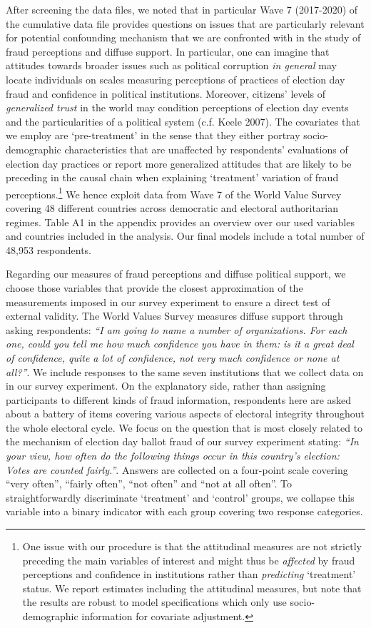 \documentclass[11pt, ngerman,english,a4]{article}
\begin{document}
After screening the data files, we noted that in particular Wave 7 (2017-2020) of the cumulative data file provides questions on issues that are particularly relevant for potential confounding mechanism that we are confronted with in the study of fraud perceptions and diffuse support. In particular, one can imagine that attitudes towards broader issues such as political corruption \textit{in general} may locate individuals on scales measuring perceptions of practices of election day fraud and confidence in political institutions. Moreover, citizens’ levels of \textit{generalized trust} in the world may condition perceptions of election day events and the particularities of a political system (c.f. Keele 2007). The covariates that we employ are `pre-treatment’ in the sense that they either portray socio-demographic characteristics that are unaffected by respondents’ evaluations of election day practices or report more generalized attitudes that are likely to be preceding in the causal chain when explaining `treatment’ variation of fraud perceptions.\footnote{One issue with our procedure is that the attitudinal measures are not strictly preceding the main variables of interest and might thus be \textit{affected} by fraud perceptions and confidence in institutions rather than \textit{predicting} `treatment' status. We report estimates including the attitudinal measures, but note that the results are robust to model specifications which only use socio-demographic information for covariate adjustment.} We hence exploit data from Wave 7 of the World Value Survey covering 48 different countries across democratic and electoral authoritarian regimes. Table A1 in the appendix provides an overview over our used variables and countries included in the analysis. Our final models include a total number of 48,953 respondents. 

Regarding our measures of fraud perceptions and diffuse political support, we choose those variables that provide the closest approximation of the measurements imposed in our survey experiment to ensure a direct test of external validity. The World Values Survey measures diffuse support through asking respondents: \textit{“I am going to name a number of organizations. For each one, could you tell me how much confidence you have in them: is it a great deal of confidence, quite a lot of confidence, not very much confidence or none at all?”}. We include responses to the same seven institutions that we collect data on in our survey experiment. On the explanatory side, rather than assigning participants to different kinds of fraud information, respondents here are asked about a battery of items covering various aspects of electoral integrity throughout the whole electoral cycle. We focus on the question that is most closely related to the mechanism of election day ballot fraud of our survey experiment stating: \textit{“In your view, how often do the following things occur in this country’s election: Votes are counted fairly.”}. Answers are collected on a four-point scale covering “very often”, “fairly often”, “not often” and “not at all often”. To straightforwardly discriminate `treatment’ and `control’ groups, we collapse this variable into a binary indicator with each group covering two response categories.  
\end{document}
